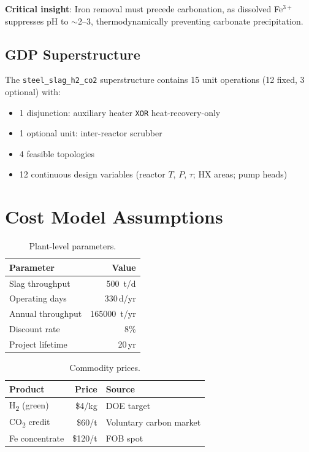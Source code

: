 \documentclass[11pt,a4paper]{article}
\begin{document}
\noindent\textbf{Critical insight}: Iron removal must precede carbonation, as dissolved
Fe$^{3+}$ suppresses pH to $\sim$2--3, thermodynamically preventing carbonate precipitation.

\subsection{GDP Superstructure}

The \texttt{steel\_slag\_h2\_co2} superstructure contains 15 unit operations
(12 fixed, 3 optional) with:
\begin{itemize}[nosep]
    \item 1 disjunction: auxiliary heater \texttt{XOR} heat-recovery-only
    \item 1 optional unit: inter-reactor scrubber
    \item 4 feasible topologies
    \item 12 continuous design variables (reactor $T$, $P$, $\tau$; HX areas; pump heads)
\end{itemize}

\section{Cost Model Assumptions}

\begin{table}[H]
\centering
\caption{Plant-level parameters.}
\label{tab:plant}
\begin{tabular}{@{}lr@{}}
\toprule
\textbf{Parameter} & \textbf{Value} \\
\midrule
Slag throughput            & \SI{500}{t/d} \\
Operating days             & 330\,d/yr \\
Annual throughput          & \SI{165000}{t/yr} \\
Discount rate              & 8\% \\
Project lifetime           & 20\,yr \\
\bottomrule
\end{tabular}
\end{table}

\begin{table}[H]
\centering
\caption{Commodity prices.}
\label{tab:prices}
\begin{tabular}{@{}lrl@{}}
\toprule
\textbf{Product} & \textbf{Price} & \textbf{Source} \\
\midrule
H\textsubscript{2} (green)       & \$4/kg      & DOE target \\
CO\textsubscript{2} credit       & \$60/t      & Voluntary carbon market \\
Fe concentrate                   & \$120/t     & FOB spot \\
\bottomrule
\end{tabular}
\end{table}
\end{document}
